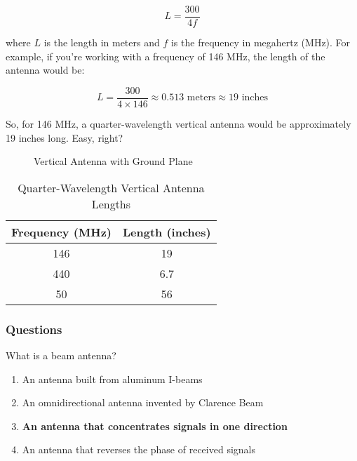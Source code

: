 \begin{equation}
L = \frac{300}{4f}
\end{equation}

where \( L \) is the length in meters and \( f \) is the frequency in megahertz (MHz). For example, if you're working with a frequency of 146 MHz, the length of the antenna would be:

\begin{equation}
L = \frac{300}{4 \times 146} \approx 0.513 \text{ meters} \approx 19 \text{ inches}
\end{equation}

So, for 146 MHz, a quarter-wavelength vertical antenna would be approximately 19 inches long. Easy, right?

\begin{figure}[h]
    \centering
    \caption{Vertical Antenna with Ground Plane}
    \label{fig:vertical-antenna}
\end{figure}

\begin{table}[h]
    \centering
    \begin{tabular}{|c|c|}
        \hline
        Frequency (MHz) & Length (inches) \\
        \hline
        146 & 19 \\
        440 & 6.7 \\
        50 & 56 \\
        \hline
    \end{tabular}
    \caption{Quarter-Wavelength Vertical Antenna Lengths}
    \label{tab:vertical-lengths}
\end{table}

\subsubsection*{Questions}

\begin{tcolorbox}[colback=gray!10!white,colframe=black!75!black,title={T9A01}]
    What is a beam antenna?
    \begin{enumerate}[label=\Alph*),noitemsep]
        \item An antenna built from aluminum I-beams
        \item An omnidirectional antenna invented by Clarence Beam
        \item \textbf{An antenna that concentrates signals in one direction}
        \item An antenna that reverses the phase of received signals
    \end{enumerate}
\end{tcolorbox}


